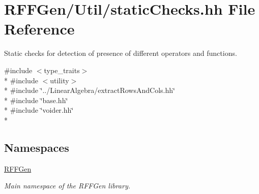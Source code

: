 \hypertarget{staticChecks_8hh}{\section{R\-F\-F\-Gen/\-Util/static\-Checks.hh File Reference}
\label{staticChecks_8hh}
}


Static checks for detection of presence of different operators and functions.  


{\ttfamily \#include $<$type\-\_\-traits$>$}\\*
{\ttfamily \#include $<$utility$>$}\\*
{\ttfamily \#include \char`\"{}../\-Linear\-Algebra/extract\-Rows\-And\-Cols.\-hh\char`\"{}}\\*
{\ttfamily \#include \char`\"{}base.\-hh\char`\"{}}\\*
{\ttfamily \#include \char`\"{}voider.\-hh\char`\"{}}\\*
\subsection*{Namespaces}
\begin{DoxyCompactItemize}
\item 
\hyperlink{namespaceRFFGen}{R\-F\-F\-Gen}
\begin{DoxyCompactList}\small\item\em Main namespace of the R\-F\-F\-Gen library. \end{DoxyCompactList}\end{DoxyCompactItemize}
